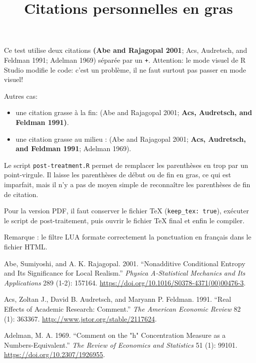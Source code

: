 \documentclass[
]{article}
\title{Citations personnelles en gras}
\author{}
\date{\vspace{-2.5em}}
\providecommand{\tightlist}{%
  \setlength{\itemsep}{0pt}\setlength{\parskip}{0pt}}
\newlength{\cslhangindent}
\newenvironment{CSLReferences}[2] %
 {\begin{list}{}{%
  \setlength{\itemindent}{0pt}
  \setlength{\leftmargin}{0pt}
  \setlength{\parsep}{0pt}
  \ifodd #1
   \setlength{\leftmargin}{\cslhangindent}
   \setlength{\itemindent}{-1\cslhangindent}
  \fi
  \setlength{\itemsep}{#2\baselineskip}}}
 {\end{list}}
\begin{document}
\maketitle

Ce test utilise deux citations \textbf{(Abe and Rajagopal 2001}; Acs,
Audretsch, and Feldman 1991; Adelman 1969) séparée par un \texttt{+}.
Attention: le mode visuel de R Studio modifie le code: c'est un
problème, il ne faut surtout pas passer en mode visuel!

Autres cas:

\begin{itemize}
\tightlist
\item
  une citation grasse à la fin: (Abe and Rajagopal 2001; \textbf{Acs,
  Audretsch, and Feldman 1991)}.
\item
  une citation grasse au milieu : (Abe and Rajagopal 2001; \textbf{Acs,
  Audretsch, and Feldman 1991}; Adelman 1969).
\end{itemize}

Le script \texttt{post-treatment.R} permet de remplacer les parenthèses
en trop par un point-virgule. Il laisse les parenthèses de début ou de
fin en gras, ce qui est imparfait, mais il n'y a pas de moyen simple de
reconnaître les parenthèses de fin de citation.

Pour la version PDF, il faut conserver le fichier TeX
(\texttt{keep\_tex:\ true}), exécuter le script de post-traitement, puis
ouvrir le fichier TeX final et enfin le compiler.

Remarque : le filtre LUA formate correctement la ponctuation en français
dans le fichier HTML.

\label{refs}
\begin{CSLReferences}{1}{0}
Abe, Sumiyoshi, and A. K. Rajagopal. 2001. {``Nonadditive Conditional
Entropy and Its Significance for Local Realism.''} \emph{Physica
A-Statistical Mechanics and Its Applications} 289 (1-2): 157164.
\url{https://doi.org/10.1016/S0378-4371(00)00476-3}.

Acs, Zoltan J., David B. Audretsch, and Maryann P. Feldman. 1991.
{``Real Effects of Academic Research: Comment.''} \emph{The American
Economic Review} 82 (1): 363367.
\url{http://www.jstor.org/stable/2117624}.

Adelman, M. A. 1969. {``Comment on the {"}h{"} Concentration Measure as
a Numbers-Equivalent.''} \emph{The Review of Economics and Statistics}
51 (1): 99101. \url{https://doi.org/10.2307/1926955}.

\end{CSLReferences}
\end{document}
